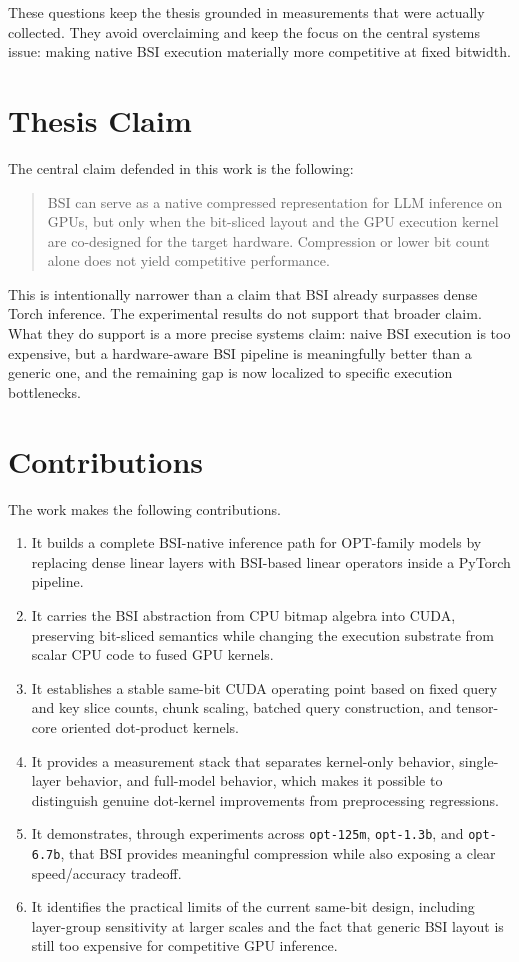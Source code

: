 These questions keep the thesis grounded in measurements that were actually collected. They avoid overclaiming and keep the focus on the central systems issue: making native BSI execution materially more competitive at fixed bitwidth.

\section{Thesis Claim}
The central claim defended in this work is the following:

\begin{quote}
BSI can serve as a native compressed representation for LLM inference on GPUs, but only when the bit-sliced layout and the GPU execution kernel are co-designed for the target hardware. Compression or lower bit count alone does not yield competitive performance.
\end{quote}

This is intentionally narrower than a claim that BSI already surpasses dense Torch inference. The experimental results do not support that broader claim. What they do support is a more precise systems claim: naive BSI execution is too expensive, but a hardware-aware BSI pipeline is meaningfully better than a generic one, and the remaining gap is now localized to specific execution bottlenecks.

\section{Contributions}
The work makes the following contributions.

\begin{enumerate}[leftmargin=2em]
\item It builds a complete BSI-native inference path for OPT-family models by replacing dense linear layers with BSI-based linear operators inside a PyTorch pipeline.
\item It carries the BSI abstraction from CPU bitmap algebra into CUDA, preserving bit-sliced semantics while changing the execution substrate from scalar CPU code to fused GPU kernels.
\item It establishes a stable same-bit CUDA operating point based on fixed query and key slice counts, chunk scaling, batched query construction, and tensor-core oriented dot-product kernels.
\item It provides a measurement stack that separates kernel-only behavior, single-layer behavior, and full-model behavior, which makes it possible to distinguish genuine dot-kernel improvements from preprocessing regressions.
\item It demonstrates, through experiments across \texttt{opt-125m}, \texttt{opt-1.3b}, and \texttt{opt-6.7b}, that BSI provides meaningful compression while also exposing a clear speed/accuracy tradeoff.
\item It identifies the practical limits of the current same-bit design, including layer-group sensitivity at larger scales and the fact that generic BSI layout is still too expensive for competitive GPU inference.
\end{enumerate}

